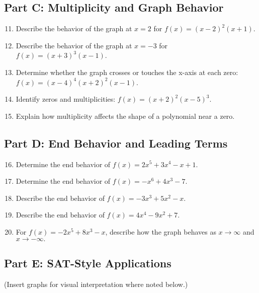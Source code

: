 \documentclass[12pt]{article}
\begin{document}
\subsection*{Part C: Multiplicity and Graph Behavior}
\begin{enumerate}
  \setcounter{enumi}{10}
  \item Describe the behavior of the graph at \(x = 2\) for \(f(x) = (x - 2)^2(x + 1)\).
  \item Describe the behavior of the graph at \(x = -3\) for \(f(x) = (x + 3)^3(x - 1)\).
  \item Determine whether the graph crosses or touches the x-axis at each zero: \(f(x) = (x - 4)^4(x + 2)^2(x - 1)\).
  \item Identify zeros and multiplicities: \(f(x) = (x + 2)^2(x - 5)^3\).
  \item Explain how multiplicity affects the shape of a polynomial near a zero.
\end{enumerate}

\subsection*{Part D: End Behavior and Leading Terms}
\begin{enumerate}
  \setcounter{enumi}{15}
  \item Determine the end behavior of \(f(x) = 2x^5 + 3x^4 - x + 1.\)
  \item Determine the end behavior of \(f(x) = -x^6 + 4x^3 - 7.\)
  \item Describe the end behavior of \(f(x) = -3x^3 + 5x^2 - x.\)
  \item Describe the end behavior of \(f(x) = 4x^4 - 9x^2 + 7.\)
  \item For \(f(x) = -2x^5 + 8x^3 - x\), describe how the graph behaves as \(x \to \infty\) and \(x \to -\infty.\)
\end{enumerate}

\subsection*{Part E: SAT-Style Applications}
(Insert graphs for visual interpretation where noted below.)
\end{document}
